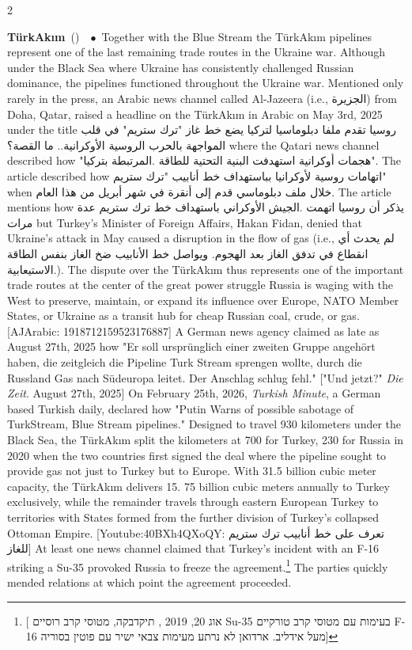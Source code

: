 \documentclass[10pt,a4paper,twoside]{article} %
\newcommand{\entry}[4]{\markboth{#1}{#1}\textbf{#1}\ {(#2)}\ \textit{#3}\ $\bullet$\ {#4}}  %
\begin{document}
\begin{multicols}{2}
\entry{\textturkish{TürkAkım}} {} {} {Together with the Blue Stream the \textturkish{TürkAkım} pipelines represent one of the last remaining trade routes in the Ukraine war. Although under the Black Sea where Ukraine has consistently challenged Russian dominance, the pipelines functioned throughout the Ukraine war. Mentioned only rarely in the press, an Arabic news channel called Al-Jazeera (i.e., \textarabic{ الجزيرة}) from Doha, Qatar, raised a headline on the \textturkish{TürkAkım} in Arabic on May 3rd, 2025 under the title \textarabic{روسيا تقدم ملفا دبلوماسيا لتركيا يضع خط غاز "ترك ستريم" في قلب المواجهة بالحرب الروسية الأوكرانية.. ما القصة؟} where the Qatari news channel described how \textarabic{"هجمات أوكرانية استهدفت البنية التحتية للطاقة .المرتبطة بتركيا"}. The article described how \textarabic{اتهامات روسية لأوكرانيا بباستهداف خط أنابيب "ترك ستريم"} when \textarabic{خلال ملف دبلوماسي قدم إلى أنقرة في شهر أبريل من هذا العام}. The article mentions how \textarabic{يذكر أن روسيا اتهمت .الجيش الأوكراني باستهداف خط ترك ستريم عدة مرات} but Turkey's Minister of Foreign Affairs, Hakan Fidan, denied that Ukraine's attack in May caused a disruption in the flow of gas (i.e., \textarabic{لم يحدث أي انقطاع في تدفق الغاز بعد الهجوم. ويواصل خط الأنابيب ضخ الغاز بنفس الطاقة الاستيعابية.}). The dispute over the \textturkish{TürkAkım} thus represents one of the important trade routes at the center of the great power struggle Russia is waging with the West to preserve, maintain, or expand its influence over Europe, NATO Member States, or Ukraine as a transit hub for cheap Russian coal, crude, or gas. [AJArabic: 1918712159523176887] A German news agency claimed as late as August 27th, 2025 how "Er soll ursprünglich einer zweiten Gruppe angehört haben, die zeitgleich die Pipeline Turk Stream sprengen wollte, durch die Russland Gas nach Südeuropa leitet. Der Anschlag schlug fehl." ["Und jetzt?" \emph{Die Zeit}. August 27th, 2025] On February 25th, 2026, \emph{Turkish Minute}, a German based Turkish daily, declared how "Putin Warns of possible sabotage of TurkStream, Blue Stream pipelines."
\newline \indent Designed to travel 930 kilometers under the Black Sea, the \textturkish{TürkAkım} split the kilometers at 700 for Turkey, 230 for Russia in 2020 when the two countries first signed the deal where the pipeline sought to provide gas not just to Turkey but to Europe.  With 31.5 billion cubic meter capacity, the \textturkish{TürkAkım} delivers 15. 75 billion cubic meters annually to Turkey exclusively, while the remainder travels through eastern European Turkey to territories with States formed from the further division of Turkey's collapsed Ottoman Empire. [Youtube:40BXh4QXoQY: تعرف على خط أنابيب ترك ستريم للغاز] At least one news channel claimed that Turkey's incident with an F-16 striking a Su-35 provoked Russia to freeze the agreement.\footnote{[\texthebrew{ אוג 20, 2019} \texthebrew{, תיקדבקה}, \texthebrew {מטוסי קרב רוסיים Su-35 בעימות עם מטוסי קרב טורקיים F-16 מעל אידליב. ארדואן לא נרתע מעימות צבאי ישיר עם פוטין בסוריה}]} The parties quickly mended relations at which point the agreement proceeded. 
}


\end{multicols}
\end{document}
